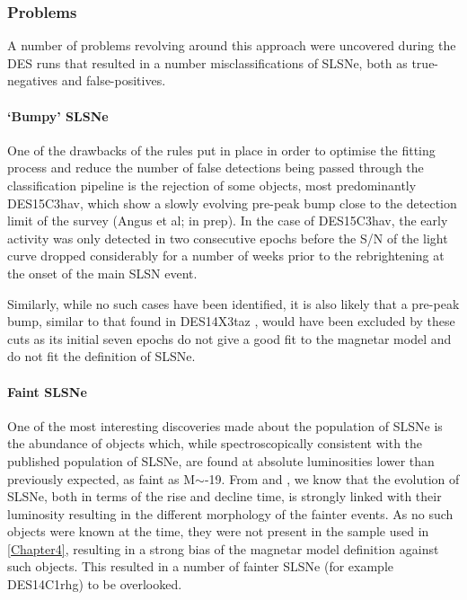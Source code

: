 \subsubsection{Problems}
A number of problems revolving around this approach were uncovered during the DES runs that resulted in a number misclassifications of SLSNe, both as true-negatives and false-positives.

\paragraph{`Bumpy' SLSNe}
One of the drawbacks of the rules put in place in order to optimise the fitting process and reduce the number of false detections being passed through the classification pipeline is the rejection of some objects, most predominantly DES15C3hav, which show a slowly evolving pre-peak bump close to the detection limit of the survey (Angus et al; in prep). In the case of DES15C3hav, the early activity was only detected in two consecutive epochs before the S/N of the light curve dropped considerably for a number of weeks prior to the rebrightening at the onset of the main SLSN event.

Similarly, while no such cases have been identified, it is also likely that a pre-peak bump, similar to that found in DES14X3taz \citep{Smith2016}, would have been excluded by these cuts as its initial seven epochs do not give a good fit to the magnetar model and do not fit the definition of SLSNe.

\paragraph{Faint SLSNe}
One of the most interesting discoveries made about the population of SLSNe is the abundance of objects which, while spectroscopically consistent with the published population of SLSNe, are found at absolute luminosities lower than previously expected, as faint as M$\sim$-19. From \citet{Inserra2018a} and \citet{Nicholl2014, Nicholl2017}, we know that the evolution of SLSNe, both in terms of the rise and decline time, is strongly linked with their luminosity resulting in the different morphology of the fainter events. As no such objects were known at the time, they were not present in the sample used in \cref{Chapter4}, resulting in a strong bias of the magnetar model definition against such objects. This resulted in a number of fainter SLSNe (for example DES14C1rhg) to be overlooked.

